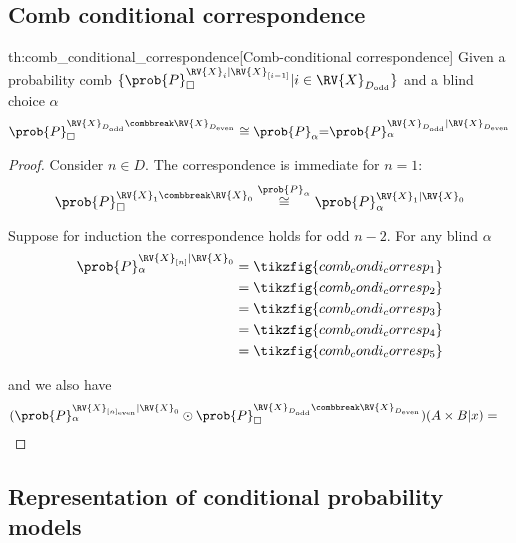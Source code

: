 \subsection{Comb conditional correspondence}\label{ap:ccc}

\begin{reptheorem}{th:comb_conditional_correspondence}[Comb-conditional correspondence]
Given a probability comb $\{\prob{P}_\square^{\RV{X}_{i}|\RV{X}_{[i-1]}}|i\in \RV{X}_{D_{\text{odd}}}\}$ and a blind choice $\alpha$
\begin{align}
\prob{P}_\square^{\RV{X}_{D_{\text{odd}}}\combbreak \RV{X}_{D_{\text{even}}}}\cong{\prob{P}_\alpha}{=}\prob{P}_\alpha^{\RV{X}_{D_{\text{odd}}}| \RV{X}_{D_{\text{even}}}}
\end{align}
\end{reptheorem}

\begin{proof}
Consider $n\in D$. The correspondence is immediate for $n=1$:
\begin{align}
    \prob{P}_\square^{\RV{X}_{1}\combbreak \RV{X}_{0}}\overset{\prob{P}_\alpha}{\cong}\prob{P}_\alpha^{\RV{X}_{1}| \RV{X}_{0}}
\end{align}

Suppose for induction the correspondence holds for odd $n-2$. For any blind $\alpha$
\begin{align}
    \prob{P}_\alpha^{\RV{X}_{[n]}|\RV{X}_0} &= \tikzfig{comb_condi_corresp_1}\\
    &= \tikzfig{comb_condi_corresp_2}\\
    &= \tikzfig{comb_condi_corresp_3}\\
    &= \tikzfig{comb_condi_corresp_4}\\
    &= \tikzfig{comb_condi_corresp_5}
\end{align}

and we also have
\begin{align}
    (\prob{P}_\alpha^{\RV{X}_{[n]_{\text{even}}}|\RV{X}_0} \odot\prob{P}_\square^{\RV{X}_{D_{\text{odd}}}\combbreak \RV{X}_{D_{\text{even}}}})(A\times B|x) &= 
\end{align}
\end{proof}

\subsection{Representation of conditional probability models}

